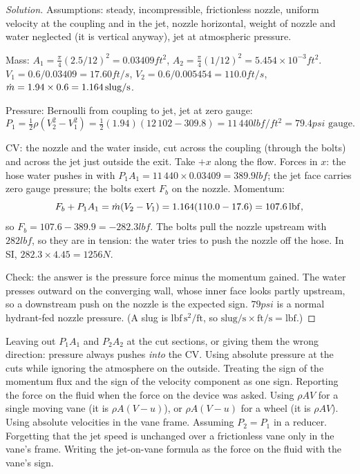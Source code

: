 \begin{proof}[Solution]
Assumptions: steady, incompressible, frictionless nozzle, uniform velocity at the coupling and in the jet, nozzle horizontal, weight of nozzle and water neglected (it is vertical anyway), jet at atmospheric pressure.

Mass: $A_1 = \tfrac{\pi}{4}(2.5/12)^2 = 0.03409\unit{ft^2}$, $A_2 = \tfrac{\pi}{4}(1/12)^2 = 5.454\times10^{-3}\unit{ft^2}$. $V_1 = 0.6/0.03409 = 17.60\unit{ft/s}$, $V_2 = 0.6/0.005454 = 110.0\unit{ft/s}$, $\dot m = 1.94\times0.6 = 1.164\,\mathrm{slug/s}$.

Pressure: Bernoulli from coupling to jet, jet at zero gauge:
\[
P_1 = \tfrac12\rho(V_2^2 - V_1^2) = \tfrac12(1.94)(12\,102 - 309.8) = 11\,440\unit{lbf/ft^2} = 79.4\unit{psi}\text{ gauge}.
\]

CV: the nozzle and the water inside, cut across the coupling (through the bolts) and across the jet just outside the exit. Take $+x$ along the flow. Forces in $x$: the hose water pushes in with $P_1A_1 = 11\,440\times0.03409 = 389.9\unit{lbf}$; the jet face carries zero gauge pressure; the bolts exert $F_b$ on the nozzle. Momentum:
\[
F_b + P_1A_1 = \dot m(V_2 - V_1) = 1.164(110.0 - 17.6) = 107.6\,\mathrm{lbf},
\]
so $F_b = 107.6 - 389.9 = -282.3\unit{lbf}$. The bolts pull the nozzle upstream with $282\unit{lbf}$, so they are in tension: the water tries to push the nozzle off the hose. In SI, $282.3\times4.45 = 1256\unit{N}$.

Check: the answer is the pressure force minus the momentum gained. The water presses outward on the converging wall, whose inner face looks partly upstream, so a downstream push on the nozzle is the expected sign. $79\unit{psi}$ is a normal hydrant-fed nozzle pressure. (A slug is $\mathrm{lbf\,s^2/ft}$, so $\mathrm{slug/s}\times\mathrm{ft/s} = \mathrm{lbf}$.)
\end{proof}

\begin{trap}
Leaving out $P_1A_1$ and $P_2A_2$ at the cut sections, or giving them the wrong direction: pressure always pushes \emph{into} the CV. Using absolute pressure at the cuts while ignoring the atmosphere on the outside. Treating the sign of the momentum flux and the sign of the velocity component as one sign. Reporting the force on the fluid when the force on the device was asked. Using $\rho AV$ for a single moving vane (it is $\rho A(V - u)$), or $\rho A(V - u)$ for a wheel (it is $\rho AV$). Using absolute velocities in the vane frame. Assuming $P_2 = P_1$ in a reducer. Forgetting that the jet speed is unchanged over a frictionless vane only in the vane's frame. Writing the jet-on-vane formula as the force on the fluid with the vane's sign.
\end{trap}

